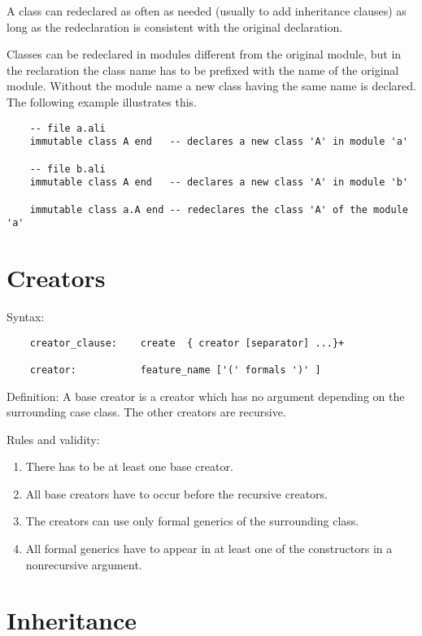 A class can redeclared as often as needed (usually to add inheritance clauses)
as long as the redeclaration is consistent with the original declaration.

Classes can be redeclared in modules different from the original module, but
in the reclaration the class name has to be prefixed with the name of the
original module. Without the module name a new class having
the same name is declared. The following example illustrates this.

\begin{lstlisting}
    -- file a.ali
    immutable class A end   -- declares a new class 'A' in module 'a'

    -- file b.ali
    immutable class A end   -- declares a new class 'A' in module 'b'

    immutable class a.A end -- redeclares the class 'A' of the module 'a'
\end{lstlisting}

\section{Creators}

\noindent Syntax:
\begin{lstlisting}
    creator_clause:    create  { creator [separator] ...}+

    creator:           feature_name ['(' formals ')' ]

\end{lstlisting}

\noindent Definition: A base creator is a creator which has no argument
depending on the surrounding case class. The other creators are recursive.

\noindent Rules and validity:
\begin{enumerate}
\item There has to be at least one base creator.

\item All base creators have to occur before the recursive creators.

\item The creators can use only formal generics of the surrounding class.

\item All formal generics have to appear in at least one of the constructors
  in a nonrecursive argument.
\end{enumerate}


\section{Inheritance}

